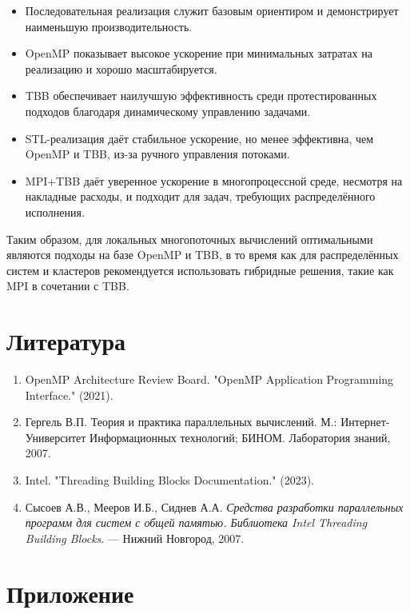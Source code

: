 \documentclass[a4paper,12pt]{article}
\begin{document}
\begin{itemize}
  \item Последовательная реализация служит базовым ориентиром и демонстрирует наименьшую производительность.
  \item OpenMP показывает высокое ускорение при минимальных затратах на реализацию и хорошо масштабируется.
  \item TBB обеспечивает наилучшую эффективность среди протестированных подходов благодаря динамическому управлению задачами.
  \item STL-реализация даёт стабильное ускорение, но менее эффективна, чем OpenMP и TBB, из-за ручного управления потоками.
  \item MPI+TBB даёт уверенное ускорение в многопроцессной среде, несмотря на накладные расходы, и подходит для задач, требующих распределённого исполнения.
\end{itemize}

Таким образом, для локальных многопоточных вычислений оптимальными являются подходы на базе OpenMP и TBB, в то время как для распределённых систем и кластеров рекомендуется использовать гибридные решения, такие как MPI в сочетании с TBB.

\newpage

\section{Литература}

\begin{enumerate}
    \item OpenMP Architecture Review Board. "OpenMP Application Programming Interface." (2021).
    \item Гергель В.П. Теория и практика параллельных вычислений. М.: Интернет-Университет Информационных технологий; БИНОМ. Лаборатория знаний, 2007.
    \item Intel. "Threading Building Blocks Documentation." (2023).
    \item Сысоев А.В., Мееров И.Б., Сиднев А.А. \textit{Средства разработки параллельных программ для систем с общей памятью. Библиотека Intel Threading Building Blocks}. — Нижний Новгород, 2007.
\end{enumerate}

\newpage

\section{Приложение}
\end{document}
